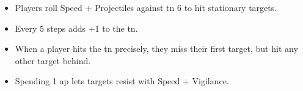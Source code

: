 \begin{itemize}
  \item
  Players roll Speed + Projectiles against \gls{tn} 6 to hit stationary targets.
  \item
  Every 5 steps adds +1 to the \gls{tn}.
  \item
  When a player hits the \gls{tn} precisely, they miss their first target, but hit any other target behind.
  \item
  Spending 1 \gls{ap} lets targets resist with Speed + Vigilance.
\end{itemize}
